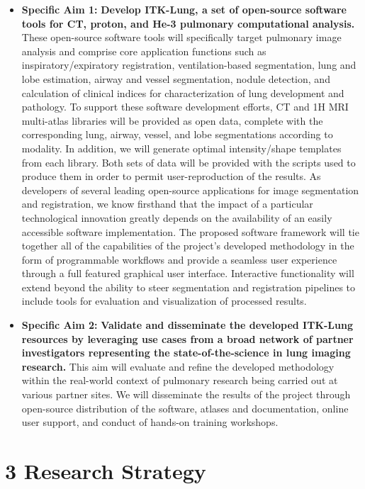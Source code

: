 \documentclass[11pt,]{article}
\providecommand{\tightlist}{%
  \setlength{\itemsep}{0pt}\setlength{\parskip}{0pt}}
\begin{document}
\begin{itemize}
\tightlist
\item
  \textbf{Specific Aim 1:} \textbf{Develop ITK-Lung, a set of
  open-source software tools for CT, proton, and He-3 pulmonary
  computational analysis.} These open-source software tools will
  specifically target pulmonary image analysis and comprise core
  application functions such as inspiratory/expiratory registration,
  ventilation-based segmentation, lung and lobe estimation, airway and
  vessel segmentation, nodule detection, and calculation of clinical
  indices for characterization of lung development and pathology. To
  support these software development efforts, CT and 1H MRI multi-atlas
  libraries will be provided as open data, complete with the
  corresponding lung, airway, vessel, and lobe segmentations according
  to modality. In addition, we will generate optimal intensity/shape
  templates from each library. Both sets of data will be provided with
  the scripts used to produce them in order to permit user-reproduction
  of the results. As developers of several leading open-source
  applications for image segmentation and registration, we know
  firsthand that the impact of a particular technological innovation
  greatly depends on the availability of an easily accessible software
  implementation. The proposed software framework will tie together all
  of the capabilities of the project's developed methodology in the form
  of programmable workflows and provide a seamless user experience
  through a full featured graphical user interface. Interactive
  functionality will extend beyond the ability to steer segmentation and
  registration pipelines to include tools for evaluation and
  visualization of processed results.
\item
  \textbf{Specific Aim 2:} \textbf{Validate and disseminate the
  developed ITK-Lung resources by leveraging use cases from a broad
  network of partner investigators representing the state-of-the-science
  in lung imaging research.} This aim will evaluate and refine the
  developed methodology within the real-world context of pulmonary
  research being carried out at various partner sites. We will
  disseminate the results of the project through open-source
  distribution of the software, atlases and documentation, online user
  support, and conduct of hands-on training workshops.
\end{itemize}

\newpage

\section{3 Research Strategy}\label{research-strategy}
\end{document}
